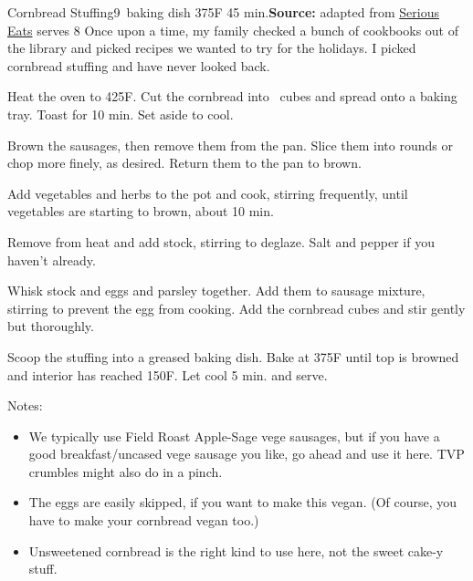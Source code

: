 \begin{recipe}{Cornbread Stuffing}{9\inch{}\inch\ baking dish \hfill 375\0F \hfill 45 min.}{\textbf{Source:} adapted from \href{https://www.seriouseats.com/cornbread-stuffing-sausage-sage-recipe}{Serious Eats} \hfill serves 8}
  \freeform Once upon a time, my family checked a bunch of cookbooks out of the library and picked recipes we wanted to try for the holidays. I picked cornbread stuffing and have never looked back.

Heat the oven to 425\0F. Cut the cornbread into \inch\ cubes and spread onto a baking tray. Toast for 10 min. Set aside to cool.

Brown the sausages, then remove them from the pan. Slice them into rounds or chop more finely, as desired. Return them to the pan to brown.

Add vegetables and herbs to the pot and cook, stirring frequently, until vegetables are starting to brown, about 10 min.

Remove from heat and add stock, stirring to deglaze. Salt and pepper if you haven't already.

Whisk stock and eggs and parsley together. Add them to sausage mixture, stirring to prevent the egg from cooking. Add the cornbread cubes and stir gently but thoroughly.

\newstep Scoop the stuffing into a greased baking dish. Bake at 375\0F until top is browned and interior has reached 150\0F. Let cool 5 min. and serve.

\freeform Notes:
\begin{itemize}
  \item We typically use Field Roast Apple-Sage vege sausages, but if you have a good breakfast/uncased vege sausage you like, go ahead and use it here. TVP crumbles might also do in a pinch.
  \item The eggs are easily skipped, if you want to make this vegan. (Of course, you have to make your cornbread vegan too.)
  \item Unsweetened cornbread is the right kind to use here, not the sweet cake-y stuff.
\end{itemize}
\end{recipe}